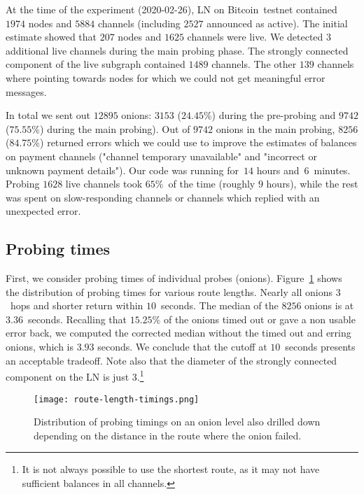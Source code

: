 At the time of the experiment (2020-02-26), LN on Bitcoin~testnet contained $1974$ nodes and $5884$ channels (including $2527$ announced as active).
The initial estimate showed that $207$ nodes and $1625$ channels were live.
We detected $3$ additional live channels during the main probing phase.
The strongly connected component of the live subgraph contained $1489$ channels.
The other $139$ channels where pointing towards nodes for which we could not get meaningful error messages.

In total we sent out $12895$ onions: $3153$ ($24.45\%$) during the pre-probing and $9742$ ($75.55\%$) during the main probing).
Out of $9742$ onions in the main probing, $8256$ ($84.75\%$) returned errors which we could use to improve the estimates of balances on payment channels ("channel temporary unavailable" and "incorrect or unknown payment details").
Our code was running for~$14$ hours and~$6$~minutes. %
Probing $1628$ live channels took $65\%$~of the time (roughly $9$ hours), while the rest was spent on slow-responding channels or channels which replied with an unexpected error.


\subsection{Probing times}

First, we consider probing times of individual probes (onions).
Figure~\ref{fig:route-length-timings} shows the distribution of probing times for various route lengths.
Nearly all onions $3$~hops and shorter return within $10$~seconds.
The median of the $8256$ onions is at $3.36$~seconds.
Recalling that $15.25\%$ of the onions timed out or gave a non usable error back, we computed the corrected median without the timed out and erring onions, which is $3.93$ seconds. 
We conclude that the cutoff at $10$~seconds presents an acceptable tradeoff.
Note also that the diameter of the strongly connected component on the LN is just $3$.\footnote{It is not always possible to use the shortest route, as it may not have sufficient balances in all channels.}

\begin{figure}[]
	\centering
	\texttt{[image: route-length-timings.png]}
	\caption{Distribution of probing timings on an onion level also drilled down depending on the distance in the route where the onion failed.}
	\label{fig:route-length-timings}
\end{figure}


